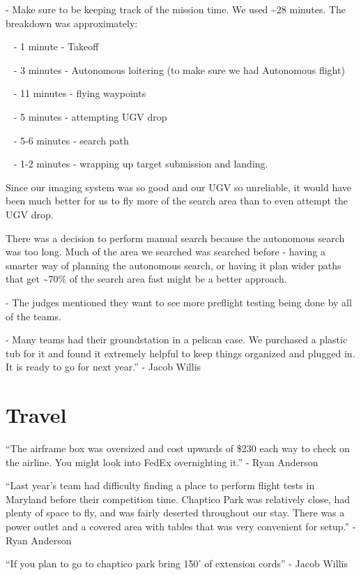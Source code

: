 \documentclass[]{auvsi_doc}
\begin{document}
{- Make sure to be keeping track of the mission time. We used
\textasciitilde{}28 minutes. The breakdown was approximately:}

{~ - 1 minute - Takeoff}

{~ - 3 minutes - Autonomous loitering (to make sure we had Autonomous
flight)}

{~ - 11 minutes - flying waypoints}

{~ - 5 minutes - attempting UGV drop}

{~ - 5-6 minutes - search path}

{~ - 1-2 minutes - wrapping up target submission and landing.}

{Since our imaging system was so good and our UGV so unreliable, it
would have been much better for us to fly more of the search area than
to even attempt the UGV drop.}

{There was a decision to perform manual search because the autonomous
search was too long. Much of the area we searched was searched before -
having a smarter way of planning the autonomous search, or having it
plan wider paths that get \textasciitilde{}70\% of the search area fast
might be a better approach.}

{- The judges mentioned they want to see more preflight testing being
done by all of the teams.}

{- Many teams had their groundstation in a pelican case. We purchased a
plastic tub for it and found it extremely helpful to keep things
organized and plugged in. It is ready to go for next year.'' - Jacob
Willis}

\section{Travel}

{``The airframe box was oversized and cost upwards of \$230 each way to
check on the airline. You might look into FedEx overnighting it.'' -
Ryan Anderson}

{}

{``Last year's team had difficulty finding a place to perform flight
tests in Maryland before their competition time. Chaptico Park was
relatively close, had plenty of space to fly, and was fairly deserted
throughout our stay. There was a power outlet and a covered area with
tables that was very convenient for setup.'' - Ryan Anderson}

{}

{``If you plan to go to chaptico park bring 150' of extension cords'' -
Jacob Willis}
\end{document}
